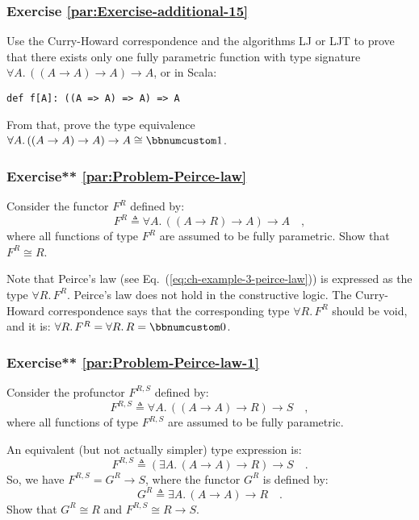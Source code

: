 \subsubsection{Exercise \label{par:Exercise-additional-15}\ref{par:Exercise-additional-15}}

Use the Curry-Howard correspondence
and the algorithms LJ or LJT to prove that there
exists only one fully parametric function with type signature $\forall A.\,((A\rightarrow A)\rightarrow A)\rightarrow A$,
or in Scala:
\begin{lstlisting}
def f[A]: ((A => A) => A) => A
\end{lstlisting}
From that, prove the type equivalence $\forall A.\,((A\rightarrow A)\rightarrow A)\rightarrow A\cong\bbnum 1$.

\subsubsection{Exercise{*}{*} \label{par:Problem-Peirce-law}\ref{par:Problem-Peirce-law}}

Consider the functor $F^{R}$ defined by:
\[
F^{R}\triangleq\forall A.\,((A\rightarrow R)\rightarrow A)\rightarrow A\quad,
\]
where all functions of type $F^{R}$ are assumed to be fully parametric.
Show that $F^{R}\cong R$.

Note that Peirce\textsf{'}s law (see Eq.~(\ref{eq:ch-example-3-peirce-law}))
is expressed as the type $\forall R.\,F^{R}$. Peirce\textsf{'}s law does not
hold in the constructive logic. The Curry-Howard correspondence says
that the corresponding type $\forall R.\,F^{R}$ should be void, and
it is: $\forall R.\,F^{R}=\forall R.\,R=\bbnum 0$. 


\subsubsection{Exercise{*}{*} \label{par:Problem-Peirce-law-1}\ref{par:Problem-Peirce-law-1}}

Consider the profunctor $F^{R,S}$ defined by:
\[
F^{R,S}\triangleq\forall A.\,((A\rightarrow A)\rightarrow R)\rightarrow S\quad,
\]
where all functions of type $F^{R,S}$ are assumed to be fully parametric. 

An equivalent (but not actually simpler) type expression is:
\[
F^{R,S}\triangleq(\exists A.\,(A\rightarrow A)\rightarrow R)\rightarrow S\quad.
\]
So, we have $F^{R,S}=G^{R}\rightarrow S$, where the functor $G^{R}$
is defined by:
\[
G^{R}\triangleq\exists A.\,(A\rightarrow A)\rightarrow R\quad.
\]
Show that $G^{R}\cong R$ and $F^{R,S}\cong R\rightarrow S$.



